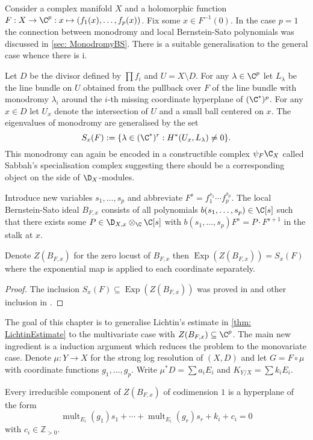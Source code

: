 Consider a complex manifold $X$ and a holomorphic function $F:X\to \C^p:x\mapsto (f_1(x),\ldots,f_p(x))$.
Fix some $x\in F^{-1}(0)$.
In the case $p=1$ the connection between monodromy and local Bernstein-Sato polynomials was discussed in \cref{sec: MonodromyBS}.
There is a suitable generalisation to the general case whence there is i.

Let $D$ be the divisor defined by $\prod f_i$ and $U = X\setminus D$.
For any $\lambda \in \C^p$ let $L_\lambda$ be the line bundle on $U$ obtained from the pullback over $F$ of the line bundle with monodromy $\lambda_i$ around the $i$-th missing coordinate hyperplane of $(\C^*)^p$.
For any $x\in D$ let $U_x$ denote the intersection of $U$ and a small ball centered on $x$.
The eigenvalues of monodromy are generalised by the set
$$S_x(F) := \{\lambda \in (\C^*)^r :H^*(U_x, L_\lambda) \neq 0\}.$$
This monodromy can again be encoded in a constructible complex $\psi_F\C_X$ called Sabbah's specialisation complex suggesting there should be a corresponding object on the side of $\D_X$-modules.

Introduce new variables $s_1,\ldots,s_p$ and abbreviate $F^s= f_1^{s_1} \cdots f_p^{s_p}$.
The local Bernstein-Sato ideal $B_{F,x}$ consists of all polynomials $b(s_1,\ldots, s_p)\in \C[s]$ such that there exists some $P\in \D_{X,x}\otimes_{\C} \C[s]$ with
$b(s_1,\ldots, s_p) F^s = P\cdot F^{s+1}$ in the stalk at $x$.
\begin{theorem}
  Denote $Z(B_{F,x})$ for the zero locust of $B_{F,x}$ then $\operatorname{Exp}(Z(B_{F,x})) = S_x(F)$ where the exponential map is applied to each coordinate separately.
\end{theorem}
\begin{proof}
  The inclusion $S_x(F) \subseteq \operatorname{Exp}(Z(B_{F,x}))$ was proved in \cite{budur2015bernstein} and other inclusion in \cite{budur2019zero}.
\end{proof}

The goal of this chapter is to generalise Lichtin's estimate in \cref{thm: LichtinEstimate} to the multivariate case with $Z(B_{F,x})\subseteq \C^p$.
The main new ingredient is a induction argument which reduces the problem to the monovariate case.
Denote $\mu:Y\to X$ for the strong log resolution of $(X,D)$ and let $G = F\circ \mu$ with coordinate functions $g_1,\ldots, g_p$.
Write $\mu^*D = \sum a_i E_i$ and $K_{Y/X} = \sum k_i E_i$.
\begin{theorem}\label{thm: EstimateBernsteinSatoZeroLocust}
  Every irreducible component of $Z(B_{F,x})$ of codimension $1$ is a hyperplane of the form
  $$\operatorname{mult}_{E_i}(g_1) s_1 + \cdots + \operatorname{mult}_{E_i}(g_r)s_r + k_i + c_i=0$$
  with $c_i \in \mathbb{Z}_{> 0 }$.
\end{theorem}


